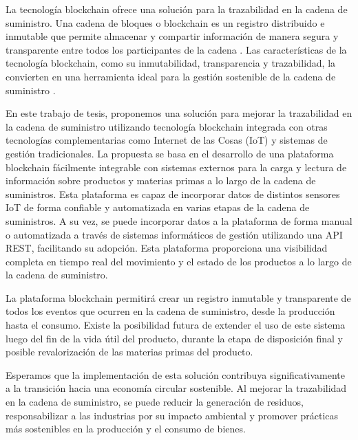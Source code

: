 \documentclass[main.tex]{subfiles}
\begin{document}
La tecnología blockchain ofrece una solución para la trazabilidad en la cadena de suministro. Una cadena de bloques o blockchain es un registro distribuido e inmutable que permite almacenar y compartir información de manera segura y transparente entre todos los participantes de la cadena \cite{rennock2018blockchain}. Las características de la tecnología blockchain, como su inmutabilidad, transparencia y trazabilidad, la convierten en una herramienta ideal para la gestión sostenible de la cadena de suministro \cite{baralla2023waste, bulkowska2023implementation, alnuaimi2023blockchain}.

En este trabajo de tesis, proponemos una solución para mejorar la trazabilidad en la cadena de suministro utilizando tecnología blockchain integrada con otras tecnologías complementarias como Internet de las Cosas (IoT) y sistemas de gestión tradicionales. La propuesta se basa en el desarrollo de una plataforma blockchain fácilmente integrable con sistemas externos para la carga y lectura de información sobre productos y materias primas a lo largo de la cadena de suministros. Esta plataforma es capaz de incorporar datos de distintos sensores IoT de forma confiable y automatizada en varias etapas de la cadena de suministros. A su vez, se puede incorporar datos a la plataforma de forma manual o automatizada a través de sistemas informáticos de gestión utilizando una API REST, facilitando su adopción. Esta plataforma proporciona una visibilidad completa en tiempo real del movimiento y el estado de los productos a lo largo de la cadena de suministro.

La plataforma blockchain permitirá crear un registro inmutable y transparente de todos los eventos que ocurren en la cadena de suministro, desde la producción hasta el consumo. Existe la posibilidad futura de extender el uso de este sistema luego del fin de la vida útil del producto, durante la etapa de disposición final y posible revalorización de las materias primas del producto.

Esperamos que la implementación de esta solución contribuya significativamente a la transición hacia una economía circular sostenible. Al mejorar la trazabilidad en la cadena de suministro, se puede reducir la generación de residuos, responsabilizar a las industrias por su impacto ambiental y promover prácticas más sostenibles en la producción y el consumo de bienes.
\end{document}
